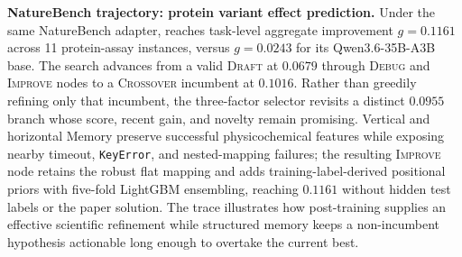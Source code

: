 \textbf{NatureBench trajectory: protein variant effect prediction.}
Under the same NatureBench adapter, \thirtyfivebmodel{} reaches task-level aggregate improvement $g=0.1161$ across 11 protein-assay instances, versus $g=0.0243$ for its Qwen3.6-35B-A3B base. The search advances from a valid \textsc{Draft} at $0.0679$ through \textsc{Debug} and \textsc{Improve} nodes to a \textsc{Crossover} incumbent at $0.1016$. Rather than greedily refining only that incumbent, the three-factor selector revisits a distinct $0.0955$ branch whose score, recent gain, and novelty remain promising. Vertical and horizontal Memory preserve successful physicochemical features while exposing nearby timeout, \texttt{KeyError}, and nested-mapping failures; the resulting \textsc{Improve} node retains the robust flat mapping and adds training-label-derived positional priors with five-fold LightGBM ensembling, reaching $0.1161$ without hidden test labels or the paper solution. The trace illustrates how post-training supplies an effective scientific refinement while structured memory keeps a non-incumbent hypothesis actionable long enough to overtake the current best.
